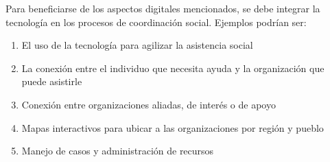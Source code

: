 \vspace{1em}
\par Para beneficiarse de los aspectos digitales mencionados, se debe integrar la tecnología en los procesos de coordinación social. Ejemplos podrían ser:
\begin{enumerate}
    \item El uso de la tecnología para agilizar la asistencia social
    \item La conexión entre el individuo que necesita ayuda y la organización que puede asistirle
    \item Conexión entre organizaciones aliadas, de interés o de apoyo
    \item Mapas interactivos para ubicar a las organizaciones por región y pueblo
    \item Manejo de casos y administración de recursos
\end{enumerate}